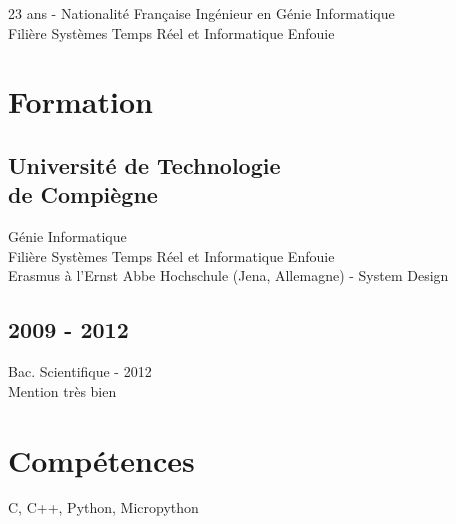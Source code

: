 \documentclass[]{cv-template}
\begin{document}
%
%
{23 ans - Nationalité Française}
{Ingénieur en Génie Informatique \\Filière Systèmes Temps Réel et Informatique Enfouie}
{}
    
%
%
\begin{minipage}[t]{0.34\textwidth} 

\section{Formation} 

\subsection[Université de Technologie de Compiègne]{Université de Technologie \\de Compiègne}
\faCaretRight Génie Informatique \\
\faCaretRight Filière Systèmes Temps Réel et Informatique Enfouie\\
\faCaretRight Erasmus à l'Ernst Abbe Hochschule (Jena, Allemagne) - System Design\\
\sectionsep

\subsection{2009 - 2012}
\faCaretRight Bac. Scientifique - 2012 \\
\faCaretRight Mention très bien \\
\sectionsep

\section{Compétences}
C, C++, Python, Micropython\\ 


\end{minipage}
\end{document}
